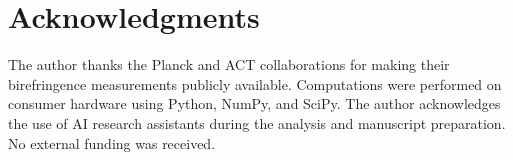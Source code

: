 \documentclass[a4paper,11pt]{article}
\begin{document}
\section*{Acknowledgments}

The author thanks the Planck and ACT collaborations for making their birefringence measurements publicly available. Computations were performed on consumer hardware using Python, NumPy, and SciPy. The author acknowledges the use of AI research assistants during the analysis and manuscript preparation. No external funding was received.


\end{document}
